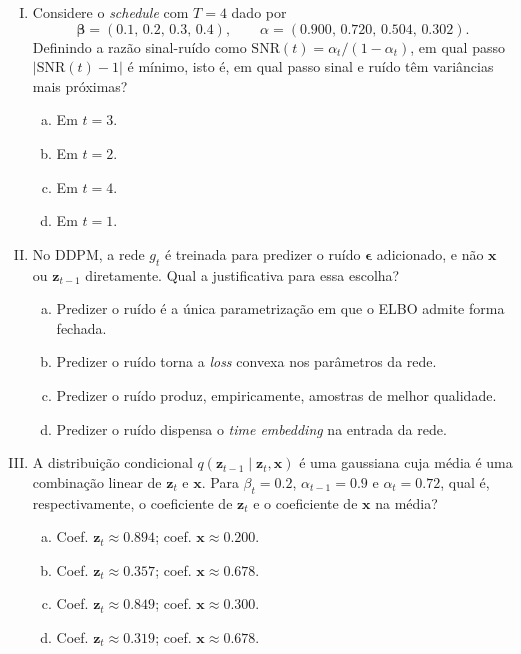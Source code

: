 \documentclass{dlproblemset}
\begin{document}
\begin{enumerate}[I)]
\item {} Considere o \textit{schedule} com $T = 4$ dado por
\[
  \boldsymbol{\beta} = (0.1,\, 0.2,\, 0.3,\, 0.4), \qquad \alpha = (0.900,\, 0.720,\, 0.504,\, 0.302).
\]
Definindo a razão sinal-ruído como $\mathrm{SNR}(t) = \alpha_t / (1 - \alpha_t)$, em qual passo $|\mathrm{SNR}(t) - 1|$ é mínimo, isto é, em qual passo sinal e ruído têm variâncias mais próximas?
\begin{enumerate}[(a)]
    \item Em $t = 3$.
    \item Em $t = 2$.
    \item Em $t = 4$.
    \item Em $t = 1$.
\end{enumerate}

\item No DDPM, a rede $g_t$ é treinada para predizer o ruído $\boldsymbol{\epsilon}$ adicionado, e não $\mathbf{x}$ ou $\mathbf{z}_{t-1}$ diretamente. Qual a justificativa para essa escolha?
\begin{enumerate}[(a)]
    \item Predizer o ruído é a única parametrização em que o ELBO admite forma fechada.
    \item Predizer o ruído torna a \textit{loss} convexa nos parâmetros da rede.
    \item Predizer o ruído produz, empiricamente, amostras de melhor qualidade.
    \item Predizer o ruído dispensa o \textit{time embedding} na entrada da rede.
\end{enumerate}

\item A distribuição condicional $q(\mathbf{z}_{t-1} \mid \mathbf{z}_t, \mathbf{x})$ é uma gaussiana cuja média é uma combinação linear de $\mathbf{z}_t$ e $\mathbf{x}$. Para $\beta_t = 0.2$, $\alpha_{t-1} = 0.9$ e $\alpha_t = 0.72$, qual é, respectivamente, o coeficiente de $\mathbf{z}_t$ e o coeficiente de $\mathbf{x}$ na média?
\begin{enumerate}[(a)]
    \item Coef. $\mathbf{z}_t \approx 0.894$; coef. $\mathbf{x} \approx 0.200$.
    \item Coef. $\mathbf{z}_t \approx 0.357$; coef. $\mathbf{x} \approx 0.678$.
    \item Coef. $\mathbf{z}_t \approx 0.849$; coef. $\mathbf{x} \approx 0.300$.
    \item Coef. $\mathbf{z}_t \approx 0.319$; coef. $\mathbf{x} \approx 0.678$.
\end{enumerate}


\end{enumerate}
\end{document}
